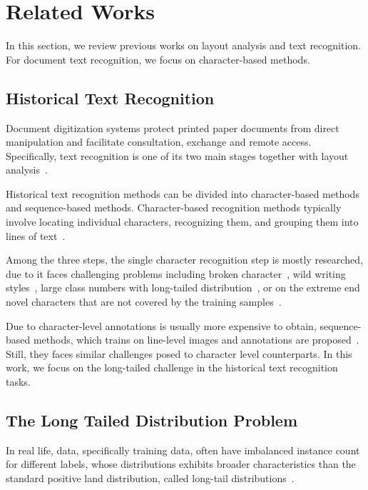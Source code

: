 \section{Related Works}
\label{sec:formatting}
In this section, we review previous works on layout analysis and text recognition. For document text recognition, we focus on character-based methods.


\subsection{Historical Text Recognition}
Document digitization systems protect printed paper documents from direct manipulation and facilitate consultation, exchange and remote access. Specifically, text recognition is one of its two main stages together with layout analysis~\cite{jla}.

Historical text recognition methods can be divided into character-based methods and sequence-based methods. 
Character-based recognition methods typically involve locating individual characters, recognizing them, and grouping them into lines of text~\cite{papytwin}.

Among the three steps, the single character recognition step is mostly researched, due to it faces challenging problems including broken character~\cite{broken}, wild writing styles~\cite{obc306}, large class numbers with long-tailed distribution~\cite{fewran}, or on the extreme end novel characters that are not covered by the training samples~\cite{hde,ligarature}.

Due to character-level annotations is usually more expensive to obtain,  sequence-based methods, which trains on line-level images and annotations are proposed~\cite{eccvfork,jinic21}. Still, they faces similar challenges posed to character level counterparts. In this work, we focus on the long-tailed challenge in the historical text recognition tasks.

\subsection{The Long Tailed Distribution Problem}


In real life, data, specifically training data, often have imbalanced instance count for different labels, whose distributions exhibits broader characteristics than the standard positive land distribution, called long-tail distributions~\cite{}. 

